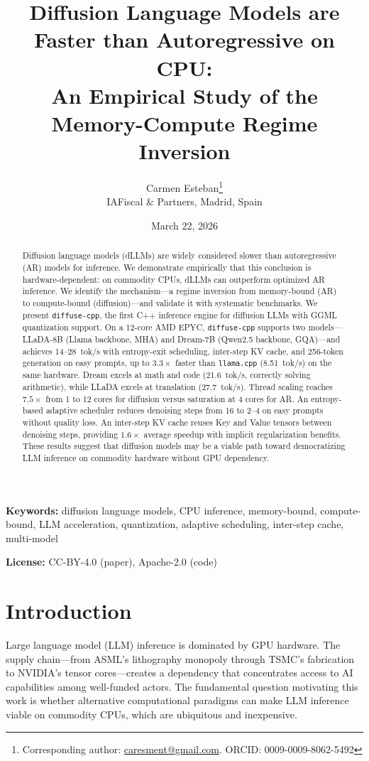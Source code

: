\documentclass[11pt]{article}
\title{Diffusion Language Models are Faster than Autoregressive on CPU:\\
An Empirical Study of the Memory-Compute Regime Inversion}
\author{Carmen Esteban\thanks{Corresponding author: \href{mailto:caresment@gmail.com}{caresment@gmail.com}. ORCID: 0009-0009-8062-5492}\\
IAFiscal \& Partners, Madrid, Spain}
\date{March 22, 2026}
\begin{document}
\maketitle

\begin{abstract}
Diffusion language models (dLLMs) are widely considered slower than autoregressive
(AR) models for inference. We demonstrate empirically that this conclusion is hardware-dependent:
on commodity CPUs, dLLMs can outperform optimized AR inference. We identify the
mechanism---a regime inversion from memory-bound (AR) to compute-bound (diffusion)---and
validate it with systematic benchmarks. We present \texttt{diffuse-cpp}, the first C++
inference engine for diffusion LLMs with GGML quantization support. On a 12-core AMD EPYC,
\texttt{diffuse-cpp} supports two models---LLaDA-8B (Llama backbone, MHA) and
Dream-7B (Qwen2.5 backbone, GQA)---and achieves 14--28~tok/s with entropy-exit
scheduling, inter-step KV cache, and 256-token generation on easy prompts, up to
$3.3\times$ faster than \texttt{llama.cpp} (8.51~tok/s) on the same hardware. Dream
excels at math and code (21.6~tok/s, correctly solving arithmetic), while LLaDA excels
at translation (27.7~tok/s). Thread scaling reaches $7.5\times$ from 1 to 12 cores for
diffusion versus saturation at 4 cores for AR. An entropy-based adaptive scheduler
reduces denoising steps from 16 to 2--4 on easy prompts without quality loss. An
inter-step KV cache reuses Key and Value tensors between denoising steps, providing
$1.6\times$ average speedup with implicit regularization benefits. These results suggest
that diffusion models may be a viable path toward democratizing LLM inference on commodity
hardware without GPU dependency.
\end{abstract}

\textbf{Keywords:} diffusion language models, CPU inference, memory-bound, compute-bound,
LLM acceleration, quantization, adaptive scheduling, inter-step cache, multi-model

\textbf{License:} CC-BY-4.0 (paper), Apache-2.0 (code)


\section{Introduction}

Large language model (LLM) inference is dominated by GPU hardware. The supply chain---from
ASML's lithography monopoly through TSMC's fabrication to NVIDIA's tensor cores---creates
a dependency that concentrates access to AI capabilities among well-funded actors. The
fundamental question motivating this work is whether alternative computational paradigms
can make LLM inference viable on commodity CPUs, which are ubiquitous and inexpensive.
\end{document}
